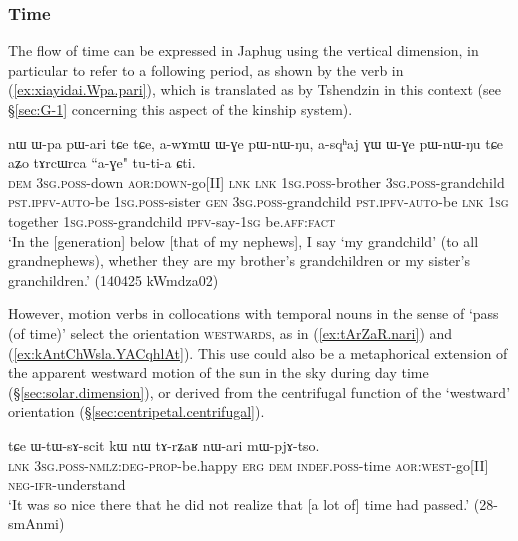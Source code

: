 \subsubsection{Time} \label{sec:vertical.preverbs.time}
The flow of time can be expressed in Japhug using the vertical dimension, in particular to refer to a following period, as shown by the verb   in (\ref{ex:xiayidai.Wpa.pari}), which is translated as  by Tshendzin in this context (see §\ref{sec:G-1} concerning this aspect of the kinship system).

\begin{exe}
\ex \label{ex:xiayidai.Wpa.pari}
\gll nɯ ɯ-pa pɯ-ari tɕe tɕe, a-wɤmɯ ɯ-ɣe pɯ-nɯ-ŋu, a-sqʰaj ɣɯ ɯ-ɣe pɯ-nɯ-ŋu tɕe aʑo tɤrcɯrca ``a-ɣe" tu-ti-a ɕti. \\
\textsc{dem} \textsc{3sg}.\textsc{poss}-down \textsc{aor}:\textsc{down}-go[II] \textsc{lnk} \textsc{lnk} \textsc{1sg}.\textsc{poss}-brother \textsc{3sg}.\textsc{poss}-grandchild \textsc{pst}.\textsc{ipfv}-\textsc{auto}-be \textsc{1sg}.\textsc{poss}-sister \textsc{gen} \textsc{3sg}.\textsc{poss}-grandchild \textsc{pst}.\textsc{ipfv}-\textsc{auto}-be \textsc{lnk} \textsc{1sg} together \textsc{1sg}.\textsc{poss}-grandchild \textsc{ipfv}-say-\textsc{1sg} be.\textsc{aff}:\textsc{fact} \\
\glt `In the [generation] below [that of my nephews], I say  `my grandchild' (to all grandnephews), whether they are my brother's grandchildren or my sister's granchildren.' (140425 kWmdza02)
\end{exe}

However, motion verbs in collocations with temporal nouns in the sense of `pass (of time)' select the orientation \textsc{westwards}, as in (\ref{ex:tArZaR.nari}) and (\ref{ex:kAntChWsla.YACqhlAt}). This use could also be a metaphorical extension of the apparent westward motion of the sun in the sky during day time  (§\ref{sec:solar.dimension}), or derived from the centrifugal function of the `westward' orientation 
(§\ref{sec:centripetal.centrifugal}).

\begin{exe}
\ex \label{ex:tArZaR.nari}
\gll   tɕe ɯ-tɯ-sɤ-scit kɯ nɯ tɤ-rʑaʁ nɯ-ari mɯ-pjɤ-tso. \\
\textsc{lnk} \textsc{3sg}.\textsc{poss}-\textsc{nmlz}:\textsc{deg}-\textsc{prop}-be.happy \textsc{erg} \textsc{dem} \textsc{indef}.\textsc{poss}-time \textsc{aor}:\textsc{west}-go[II] \textsc{neg}-\textsc{ifr}-understand \\
\glt  `It was so nice there that he did not realize that [a lot of] time had passed.' (28-smAnmi) 
\end{exe}

